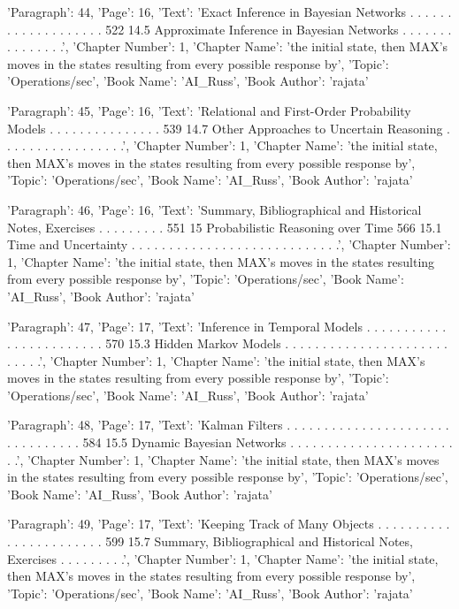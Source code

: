 {'Paragraph': 44, 'Page': 16, 'Text': 'Exact Inference in Bayesian Networks . . . . . . . . . . . . . . . . . . . 522 14.5 Approximate Inference in Bayesian Networks . . . . . . . . . . . . . . .', 'Chapter Number': 1, 'Chapter Name': 'the initial state, then MAX’s moves in the states resulting from every possible response by', 'Topic': 'Operations/sec', 'Book Name': 'AI_Russ', 'Book Author': 'rajata'}

{'Paragraph': 45, 'Page': 16, 'Text': 'Relational and First-Order Probability Models . . . . . . . . . . . . . . . 539 14.7 Other Approaches to Uncertain Reasoning . . . . . . . . . . . . . . . . .', 'Chapter Number': 1, 'Chapter Name': 'the initial state, then MAX’s moves in the states resulting from every possible response by', 'Topic': 'Operations/sec', 'Book Name': 'AI_Russ', 'Book Author': 'rajata'}

{'Paragraph': 46, 'Page': 16, 'Text': 'Summary, Bibliographical and Historical Notes, Exercises . . . . . . . . . 551 15 Probabilistic Reasoning over Time 566 15.1 Time and Uncertainty . . . . . . . . . . . . . . . . . . . . . . . . . . . .', 'Chapter Number': 1, 'Chapter Name': 'the initial state, then MAX’s moves in the states resulting from every possible response by', 'Topic': 'Operations/sec', 'Book Name': 'AI_Russ', 'Book Author': 'rajata'}

{'Paragraph': 47, 'Page': 17, 'Text': 'Inference in Temporal Models . . . . . . . . . . . . . . . . . . . . . . . . 570 15.3 Hidden Markov Models . . . . . . . . . . . . . . . . . . . . . . . . . . .', 'Chapter Number': 1, 'Chapter Name': 'the initial state, then MAX’s moves in the states resulting from every possible response by', 'Topic': 'Operations/sec', 'Book Name': 'AI_Russ', 'Book Author': 'rajata'}

{'Paragraph': 48, 'Page': 17, 'Text': 'Kalman Filters . . . . . . . . . . . . . . . . . . . . . . . . . . . . . . . . 584 15.5 Dynamic Bayesian Networks . . . . . . . . . . . . . . . . . . . . . . . .', 'Chapter Number': 1, 'Chapter Name': 'the initial state, then MAX’s moves in the states resulting from every possible response by', 'Topic': 'Operations/sec', 'Book Name': 'AI_Russ', 'Book Author': 'rajata'}

{'Paragraph': 49, 'Page': 17, 'Text': 'Keeping Track of Many Objects . . . . . . . . . . . . . . . . . . . . . . . 599 15.7 Summary, Bibliographical and Historical Notes, Exercises . . . . . . . . .', 'Chapter Number': 1, 'Chapter Name': 'the initial state, then MAX’s moves in the states resulting from every possible response by', 'Topic': 'Operations/sec', 'Book Name': 'AI_Russ', 'Book Author': 'rajata'}

